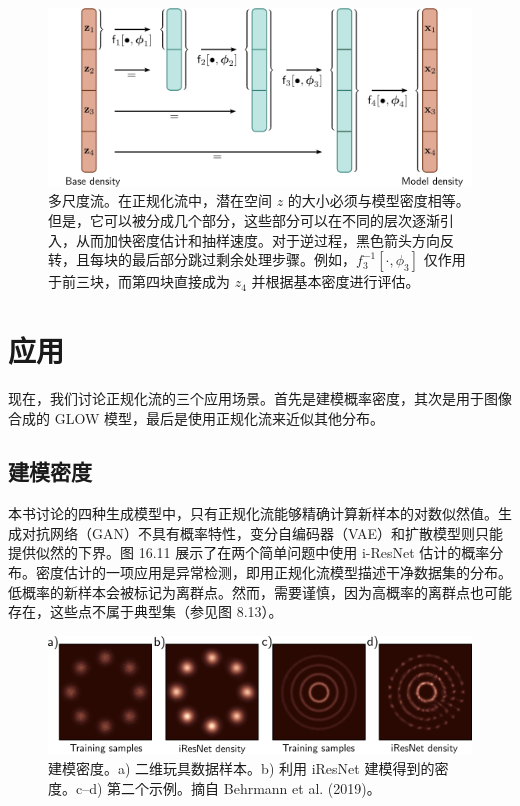 \begin{figure}[ht!]
\centering
\includegraphics[width=0.7\linewidth]{png/chapter16/FlowMultiscale.png}
\caption{多尺度流。在正规化流中，潜在空间 \( z \) 的大小必须与模型密度相等。但是，它可以被分成几个部分，这些部分可以在不同的层次逐渐引入，从而加快密度估计和抽样速度。对于逆过程，黑色箭头方向反转，且每块的最后部分跳过剩余处理步骤。例如，\( f^{-1}_3[\cdot, \phi_3] \) 仅作用于前三块，而第四块直接成为 \( z_4 \) 并根据基本密度进行评估。}
\end{figure}


\section{应用}
现在，我们讨论正规化流的三个应用场景。首先是建模概率密度，其次是用于图像合成的 GLOW 模型，最后是使用正规化流来近似其他分布。

\subsection{建模密度}

本书讨论的四种生成模型中，只有正规化流能够精确计算新样本的对数似然值。生成对抗网络（GAN）不具有概率特性，变分自编码器（VAE）和扩散模型则只能提供似然的下界。图 16.11 展示了在两个简单问题中使用 i-ResNet 估计的概率分布。密度估计的一项应用是异常检测，即用正规化流模型描述干净数据集的分布。低概率的新样本会被标记为离群点。然而，需要谨慎，因为高概率的离群点也可能存在，这些点不属于典型集（参见图 8.13）。

\begin{figure}[ht!]
\centering
\includegraphics[width=0.7\linewidth]{png/chapter16/FlowIResNetResults.png}
\caption{建模密度。a) 二维玩具数据样本。b) 利用 iResNet 建模得到的密度。c–d) 第二个示例。摘自 Behrmann et al. (2019)。}
\end{figure}


